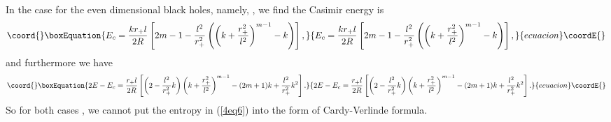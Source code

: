 \documentclass[a4paper,12pt]{article}
\begin{document}
In the case for the even dimensional black holes, namely, \coordHE{}, we find 
the Casimir energy is
\begin{equation}\coord{}\boxEquation{
\label{4eq8}
E_c= \frac{kr_+l}{2R}\left [ 2m-1 -\frac{l^2}{r_+^2}\left(\left(k+\frac{r_+^2}
      {l^2}\right)^{m-1}-k\right)\right],
}{
E_c= \frac{kr_+l}{2R}\left [ 2m-1 -\frac{l^2}{r_+^2}\left(\left(k+\frac{r_+^2}
      {l^2}\right)^{m-1}-k\right)\right],
}{ecuacion}\coordE{}\end{equation}
and furthermore we have
\begin{equation}\coord{}\boxEquation{
\label{4eq9}
2E-E_c=\frac{r_+l}{2R}\left[ \left(2-\frac{l^2}{r_+^2}k\right) 
     \left(k+\frac{r_+^2}{l^2}\right)^{m-1}- (2m+1)k 
   +\frac{l^2}{r_+^2}k^2\right].
}{
2E-E_c=\frac{r_+l}{2R}\left[ \left(2-\frac{l^2}{r_+^2}k\right) 
     \left(k+\frac{r_+^2}{l^2}\right)^{m-1}- (2m+1)k 
   +\frac{l^2}{r_+^2}k^2\right].
}{ecuacion}\coordE{}\end{equation}
So for both cases \coordHE{}, we cannot put the entropy in (\ref{4eq6})
into the form of Cardy-Verlinde formula. 
\end{document}
